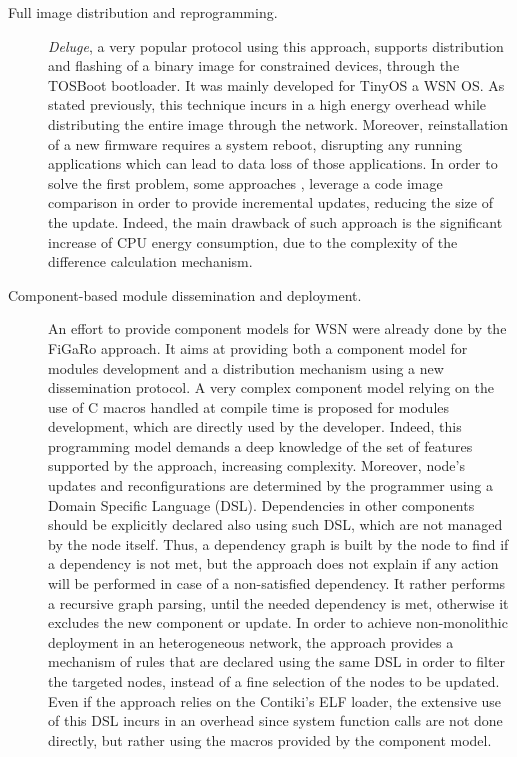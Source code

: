 \begin{description}
	\item[Full image distribution and reprogramming.] \textit{Deluge}\cite{hui2004dynamic}, a very popular protocol using this approach, supports distribution and flashing of a binary image for constrained devices, through the TOSBoot bootloader.
	It was mainly developed for TinyOS\cite{levis2005tinyos} a WSN OS.
	As stated previously, this technique incurs in a high energy overhead while distributing the entire image through the network.
	Moreover, reinstallation of a new firmware requires a system reboot, disrupting any running applications which can lead to data loss of those applications.
	In order to solve the first problem, some approaches \cite{jeong2004incremental}, \cite{reijers2003efficient} leverage a code image comparison in order to provide incremental updates, reducing the size of the update.
	Indeed, the main drawback of such approach is the significant increase of CPU energy consumption, due to the complexity of the difference calculation mechanism.
	
	\item[Component-based module dissemination and deployment.] An effort to provide component models for WSN were already done by the FiGaRo approach\cite{mottola2008figaro}.
	It aims at providing both a component model for modules development and a distribution mechanism using a new dissemination protocol.
	A very complex component model relying on the use of C macros handled at compile time is proposed for modules development, which are directly used by the developer.
	Indeed, this programming model demands a deep knowledge of the set of features supported by the approach, increasing complexity.
	Moreover, node's updates and reconfigurations are determined by the programmer using a Domain Specific Language (DSL).
	Dependencies in other components should be explicitly declared also using such DSL, which are not managed by the node itself.
	Thus, a dependency graph is built by the node to find if a dependency is not met, but the approach does not explain if any action will be performed in case of a non-satisfied dependency.
	It rather performs a recursive graph parsing, until the needed dependency is met, otherwise it excludes the new component or update.
	In order to achieve non-monolithic deployment in an heterogeneous network, the approach provides a mechanism of rules that are declared using the same DSL in order to filter the targeted nodes, instead of a fine selection of the nodes to be updated.
	Even if the approach relies on the Contiki's ELF loader, the extensive use of this DSL incurs in an overhead since system function calls are not done directly, but rather using the macros provided by the component model.
	

\end{description}
